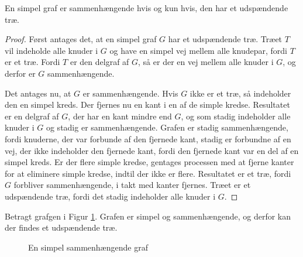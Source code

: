 \begin{thm}
En simpel graf er sammenhængende hvis og kun hvis, den har et udspændende træ.
\end{thm}

\begin{proof}
Først antages det, at en simpel graf $G$ har et udspændende træ. 
Træet $T$ vil indeholde alle knuder i $G$ og have en simpel vej mellem alle knudepar, fordi $T$ er et træ. 
Fordi $T$ er den delgraf af $G$, så er der en vej mellem alle knuder i $G$, og derfor er $G$ sammenhængende.

Det antages nu, at $G$ er sammenhængende. Hvis $G$ ikke er et træ, så indeholder den en simpel kreds. 
Der fjernes nu en kant i en af de simple kredse. 
Resultatet er en delgraf af $G$, der har en kant mindre end $G$, og som stadig indeholder alle knuder i $G$ og stadig er sammenhængende. 
Grafen er stadig sammenhængende, fordi knuderne, der var forbunde af den fjernede kant, stadig er forbundne af en vej, der ikke indeholder den fjernede kant, fordi den fjernede kant var en del af en simpel kreds. 
Er der flere simple kredse, gentages processen med at fjerne kanter for at eliminere simple kredse, indtil der ikke er flere. 
Resultatet er et træ, fordi $G$ forbliver sammenhængende, i takt med kanter fjernes. Træet er et udspændende træ, fordi det stadig indeholder alle knuder i $G$.
\end{proof}

\begin{exmp}
Betragt grafgen i Figur \ref{eksempel_udspaendende}. Grafen er simpel og sammenhængende, og derfor kan der findes et udspændende træ. 
\end{exmp}

\begin{figure}[h]
\centering
{}
\caption{En simpel sammenhængende graf} 
\label{eksempel_udspaendende}
\end{figure}

